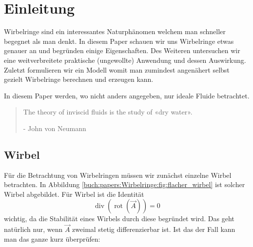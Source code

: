 %
%
%
\section{Einleitung}



Wirbelringe sind ein interessantes Naturphänomen welchem man schneller begegnet als man denkt. 
In diesem Paper schauen wir uns Wirbelringe etwas genauer an und begründen einige Eigenschaften. 
Des Weiteren untersuchen wir eine weitverbreitete praktische (ungewollte) Anwendung und dessen Auswirkung. 
Zuletzt formulieren wir ein Modell womit man zumindest angenähert selbst gezielt Wirbelringe berechnen und erzeugen kann.

In diesem Paper werden, wo nicht anders angegeben, nur ideale Fluide betrachtet.

\begin{quote}
    The theory of inviscid fluids is the study of «dry water».

    - John von Neumann \cite{Wirbelringe:feynman1964lectures}
\end{quote}

\subsection{Wirbel}



Für die Betrachtung von Wirbelringen müssen wir zunächst einzelne Wirbel betrachten. 
In Abbildung \ref{buch:papers:Wirbelringe:fig:flacher_wirbel} ist solcher Wirbel abgebildet. 
Für Wirbel ist die Identität
\begin{equation}
    \label{paper:Wirbelringe:eq:wIdent}
\operatorname{div} ( \operatorname{rot} \left( \vec{A} \right) ) 
= 
0
\end{equation}
wichtig, da die Stabilität eines Wirbels durch diese begründet wird.  
Das geht natürlich nur, wenn \(\vec{A}\) zweimal stetig differenzierbar ist. 
Ist das der Fall kann man das ganze kurz überprüfen:

